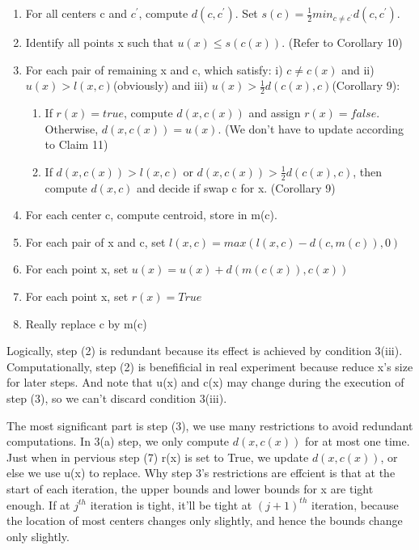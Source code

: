\documentclass[11pt]{article}
\begin{document}
\begin{enumerate}
\item For all centers c and $c^{\prime}$, compute $d(c, c^{\prime})$. Set $s(c) = \frac{1}{2}min_{c \ne c^{\prime}}d(c,c^{\prime})$.
\item Identify all points x such that $u(x) \le s(c(x))$. (Refer to Corollary 10)
\item For each pair of remaining x and c, which satisfy: i) $c \ne c(x)$ and ii) $u(x) > l(x,c)$(obviously) and iii) $u(x) > \frac{1}{2}d(c(x), c)$(Corollary 9): 
\begin{enumerate}
\item If $r(x) = true$, compute $d(x,c(x))$ and assign $r(x)=false$. Otherwise, $d(x,c(x)) = u(x).$ (We don't have to update according to Claim 11)
\item  If $d(x,c(x))> l(x,c)$ or $d(x,c(x)) > \frac{1}{2}d(c(x), c)$, then compute $d(x,c)$ and decide if swap c for x. (Corollary 9)
\end{enumerate}
\item For each center c, compute centroid, store in m(c).
\item For each  pair of x and c, set $l(x,c) = max(l(x,c) - d(c,m(c)), 0)$
\item For each point x, set $u(x) = u(x) + d(m(c(x)), c(x))$
\item For each point x, set $r(x) = True$
\item Really replace c by m(c)
\end{enumerate}

Logically, step (2) is redundant because its effect is achieved by condition 3(iii). Computationally, step (2) is benefificial in real experiment because reduce x's size for later steps. And note that u(x) and c(x) may change during the execution of step (3), so we can't discard condition 3(iii).\par
The most significant part is step (3), we use many restrictions to avoid redundant computations. In 3(a) step, we only compute $d(x,c(x))$ for at most one time. Just when in pervious step (7) r(x) is set to True, we update  $d(x,c(x))$, or else we use u(x) to replace. Why step 3's restrictions are effcient is that at the start of each iteration, the upper bounds and lower bounds for x are tight enough. If at $j^{th}$ iteration is tight, it'll be tight at $(j+1)^{th}$ iteration, because the location of most centers changes only slightly, and hence the bounds change only slightly. \par
\end{document}
